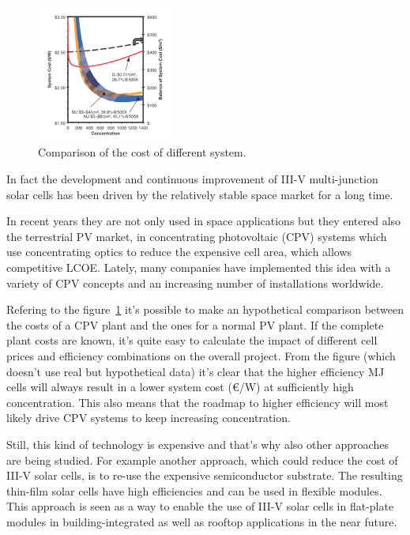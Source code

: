 \documentclass[11pt]{article} %
\begin{document}
\begin{figure}
	\centering
	\includegraphics[width=0.4\textwidth]{img/sadasd.png}
	\caption{Comparison of the cost of different system.\label{fig:aa}}
	\vspace{-130pt}
\end{figure}

In fact the development and continuous improvement of III-V multi-junction solar cells has been driven by the relatively stable space market for a long time.  


 In recent years they are not  only used in space applications but they entered also the terrestrial PV market, in  concentrating  photovoltaic  (CPV)  systems which use  concentrating  optics  to  reduce  the  expensive  cell  area,  which  allows  competitive  LCOE.  Lately, many  companies  have  implemented  this  idea  with  a  variety  of  CPV  concepts  and  an  increasing number of installations worldwide.   

 
Refering to the figure~\ref{fig:aa} it’s possible to make an hypothetical comparison between the costs of a CPV plant and the ones for a normal PV plant. If the complete plant costs are known, it’s quite easy to calculate the impact of different cell prices and efficiency combinations on the overall project. From the figure (which doesn’t use real but hypothetical data) it’s clear that the higher efficiency MJ cells will always result in a lower system cost (€/W) at sufficiently high concentration. This also means that the roadmap to higher efficiency will most likely drive CPV systems to keep increasing concentration.   

Still, this kind of technology is expensive and that’s why also other approaches are being studied. For example another  approach, which  could  reduce  the cost  of  III-V  solar  cells,  is  to re-use  the  expensive semiconductor substrate. The resulting thin-film solar cells have high efficiencies and can be used in flexible modules. This approach is  seen  as  a  way  to  enable  the  use  of  III-V  solar  cells  in  flat-plate modules in building-integrated as well as rooftop applications in the near future. 
\end{document}
